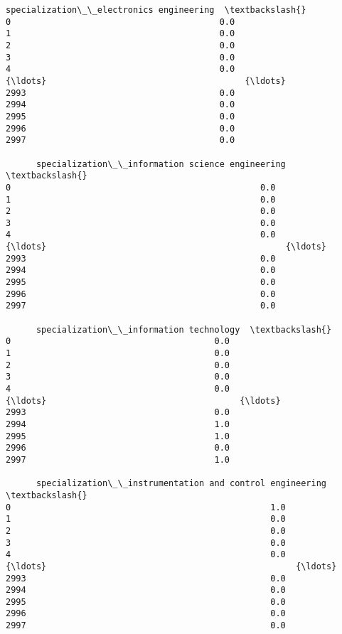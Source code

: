 \documentclass[11pt]{article}
\begin{document}
\begin{Verbatim}[commandchars=\\\{\}]
      specialization\_\_electronics engineering  \textbackslash{}
0                                         0.0   
1                                         0.0   
2                                         0.0   
3                                         0.0   
4                                         0.0   
{\ldots}                                       {\ldots}   
2993                                      0.0   
2994                                      0.0   
2995                                      0.0   
2996                                      0.0   
2997                                      0.0   

      specialization\_\_information science engineering  \textbackslash{}
0                                                 0.0   
1                                                 0.0   
2                                                 0.0   
3                                                 0.0   
4                                                 0.0   
{\ldots}                                               {\ldots}   
2993                                              0.0   
2994                                              0.0   
2995                                              0.0   
2996                                              0.0   
2997                                              0.0   

      specialization\_\_information technology  \textbackslash{}
0                                        0.0   
1                                        0.0   
2                                        0.0   
3                                        0.0   
4                                        0.0   
{\ldots}                                      {\ldots}   
2993                                     0.0   
2994                                     1.0   
2995                                     1.0   
2996                                     0.0   
2997                                     1.0   

      specialization\_\_instrumentation and control engineering  \textbackslash{}
0                                                   1.0         
1                                                   0.0         
2                                                   0.0         
3                                                   0.0         
4                                                   0.0         
{\ldots}                                                 {\ldots}         
2993                                                0.0         
2994                                                0.0         
2995                                                0.0         
2996                                                0.0         
2997                                                0.0         


\end{Verbatim}
\end{document}
